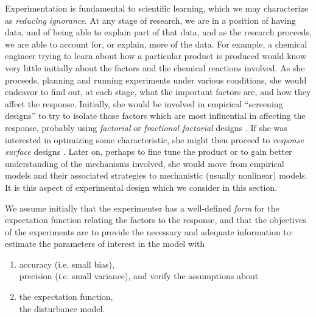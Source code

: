 Experimentation is fundamental to scientific learning, which we
may characterize as {\em reducing ignorance}.
At any stage of research, we are in a position of having data,
and of being able to explain part of that data, and
as the research proceeds, we are able to account for, or
explain, more of the data.
For example, a chemical engineer trying to learn about how a
particular product is produced would know very little initially
about the factors and the chemical reactions involved.
As she proceeds, planning and running experiments under various
conditions, she would endeavor to find out, at each stage, what
the important factors are, and how they affect the response.
Initially, she would be involved in empirical ``screening designs''
to try to isolate those factors which are most influential in
affecting the response, probably using {\em factorial\/} or
{\em fractional factorial\/} designs
\cite{box:hunt:hunt:1978}.
If she was interested in optimizing some characteristic, she
might then proceed to {\em response surface\/} designs
\cite{box:drap:1987,box:hunt:hunt:1978}.
Later on, perhaps to fine tune the product or to gain better
understanding of the mechanisms involved, she would move from
empirical models and their associated strategies to mechanistic
(usually nonlinear) models.
It is this aspect of experimental design which we consider in
this section.

We assume initially that the experimenter has a well-defined
{\em form\/} for the expectation function relating the
factors to the response, and that the objectives
of the experiments are to provide the necessary and adequate
information to:
estimate the parameters of interest in the model with
  \begin{enumerate}
    \item accuracy (i.e. small bias),\\
          precision (i.e. small variance), and
verify the assumptions about
    \item the expectation function,\\
          the disturbance model.
  \end{enumerate}

